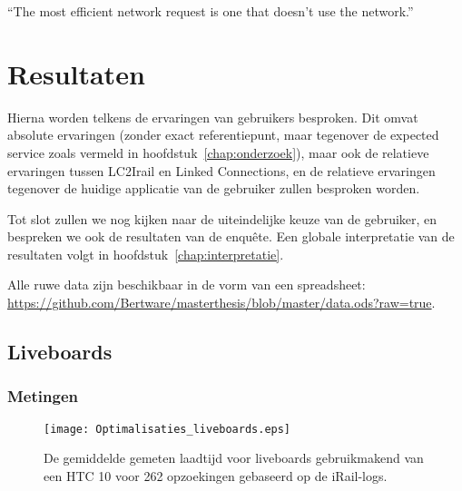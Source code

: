 \begin{savequote}[0.55\linewidth]
	``The most efficient network request is one that doesn't use the network.''
\end{savequote}

\chapter{Resultaten}
\label{chap:resultaten}

Hierna worden telkens de ervaringen van gebruikers besproken. Dit omvat absolute ervaringen (zonder exact referentiepunt, maar tegenover de expected service zoals vermeld in hoofdstuk~\ref{chap:onderzoek}), maar ook de relatieve ervaringen tussen LC2Irail en Linked Connections, en de relatieve ervaringen tegenover de huidige applicatie van de gebruiker zullen besproken worden.

Tot slot zullen we nog kijken naar de uiteindelijke keuze van de gebruiker, en bespreken we ook de resultaten van de enquête. Een globale interpretatie van de resultaten volgt in hoofdstuk~\ref{chap:interpretatie}.

Alle ruwe data zijn beschikbaar in de vorm van een spreadsheet: \url{https://github.com/Bertware/masterthesis/blob/master/data.ods?raw=true}.

\section{Liveboards}
\subsection{Metingen}
\begin{figure}[h]
	\centering
	\texttt{[image: Optimalisaties\_liveboards.eps]}
		\caption[Gemeten laadtijd liveboards bij verschillende implementatiedetails]{De gemiddelde gemeten laadtijd voor liveboards gebruikmakend van een HTC 10 voor 262 opzoekingen gebaseerd op de iRail-logs. }
	\label{fig:liveboardlabtest}
\end{figure}
%		

